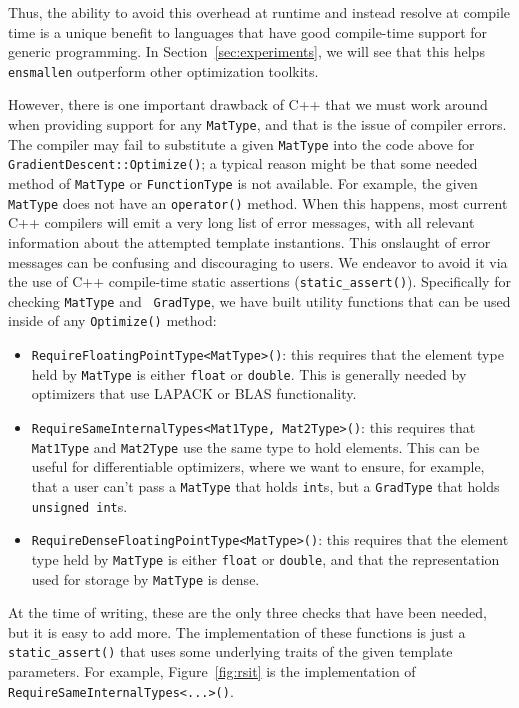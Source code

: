 Thus, the ability to avoid this overhead at runtime and instead resolve at
compile time is a unique benefit to languages that have good compile-time
support for generic programming.  In Section~\ref{sec:experiments}, we will see
that this helps {\tt ensmallen} outperform other optimization toolkits.

However, there is one important drawback of C++ that we must work around when
providing support for any {\tt MatType}, and that is the issue of compiler
errors.  The compiler may fail to substitute a given {\tt MatType} into the
code above for {\tt GradientDescent::Optimize()}; a typical reason might be that
some needed method of {\tt MatType} or {\tt FunctionType} is not available.
For example, the given {\tt MatType} does not have an {\tt operator\*()} method.
When this happens, most current C++ compilers will emit a very long list
of error messages, with all relevant information about the attempted
template instantions.
This onslaught of error messages can be confusing and discouraging to users.
We endeavor to avoid it via the use of C++ compile-time static assertions
({\tt static\_assert()}).  Specifically for checking {\tt MatType} and {\tt
GradType}, we have built utility functions that can be used inside of any
{\tt Optimize()} method:

\begin{itemize}
  \item {\tt RequireFloatingPointType<MatType>()}: this requires that the
element type held by {\tt MatType} is either {\tt float} or {\tt double}.
This is generally needed by optimizers that use LAPACK or BLAS functionality.

  \item {\tt RequireSameInternalTypes<Mat1Type, Mat2Type>()}: this requires that
{\tt Mat1Type} and {\tt Mat2Type} use the same type to hold elements.  This can
be useful for differentiable optimizers, where we want to ensure, for example,
that a user can't pass a {\tt MatType} that holds {\tt int}s, but a {\tt GradType} that
holds {\tt unsigned int}s.

  \item {\tt RequireDenseFloatingPointType<MatType>()}: this requires that the
element type held by {\tt MatType} is either {\tt float} or {\tt double}, and
that the representation used for storage by {\tt MatType} is dense.
\end{itemize}

At the time of writing, these are the only three checks that have
been needed, but it is easy to add more.  The implementation of these functions
is just a {\tt static\_assert()} that uses some underlying traits of the given
template parameters.  For example, Figure~\ref{fig:rsit} is the implementation
of {\tt RequireSameInternalTypes<...>()}.

